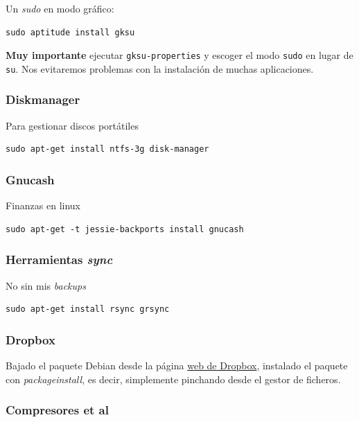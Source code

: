 \documentclass[12pt,spanish,]{article}
\begin{document}
Un \emph{sudo} en modo gráfico:

\begin{verbatim}
sudo aptitude install gksu
\end{verbatim}

\textbf{Muy importante} ejecutar \texttt{gksu-properties} y escoger el
modo \texttt{sudo} en lugar de \texttt{su}. Nos evitaremos problemas con
la instalación de muchas aplicaciones.

\subsubsection{Diskmanager}\label{diskmanager}

Para gestionar discos portátiles

\begin{verbatim}
sudo apt-get install ntfs-3g disk-manager
\end{verbatim}

\subsubsection{Gnucash}\label{gnucash}

Finanzas en linux

\begin{verbatim}
sudo apt-get -t jessie-backports install gnucash
\end{verbatim}

\subsubsection{\texorpdfstring{Herramientas
\emph{sync}}{Herramientas sync}}\label{herramientas-sync}

No sin mis \emph{backups}

\begin{verbatim}
sudo apt-get install rsync grsync
\end{verbatim}

\subsubsection{Dropbox}\label{dropbox}

Bajado el paquete Debian desde la página
\href{https://www.dropbox.com/install-linux}{web de Dropbox}, instalado
el paquete con \emph{packageinstall}, es decir, simplemente pinchando
desde el gestor de ficheros.

\subsubsection{Compresores et al}\label{compresores-et-al}
\end{document}
